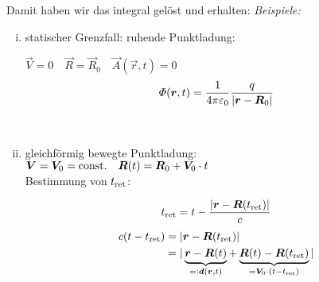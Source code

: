 Damit haben wir das integral gelöst und erhalten:
\noindent
\emph{Beispiele:}
\begin{enumerate}[i)]
	\item statischer Grenzfall: ruhende Punktladung:\\
	\begin{minipage}{.8\linewidth}
		$ \vec{V} = 0 \quad \vec{R} = \vec{R}_0 \quad \vec{A}(\vec{r},t) = 0 $
		\begin{equation*}
		\varPhi(\bm{r},t) = \frac{1}{4\pi\varepsilon_0} \frac{q}{|\bm{r} - \bm{R}_0|}
		\end{equation*}
	\end{minipage}%
	\begin{minipage}{.2\linewidth}
		\flushright
	\end{minipage}%
	\\
	\item gleichförmig bewegte Punktladung:\\
	$ \bm{V} = \bm{V}_0 = \textrm{const.} \quad \bm{R}(t) = \bm{R}_0 + \bm{V}_0 \cdot t $\\[5pt]
	Bestimmung von $ t_{\textrm{ret}} $:\\
	\begin{minipage}{.6\linewidth}
		\begin{equation*}
		t_{\textrm{ret}} = t - \frac{|\bm{r} - \bm{R}(t_{\textrm{ret}})|}{c}
		\end{equation*}
		\begin{align*}
		c(t - t_{\tx{ret}}) &= |\vec{r} - \vec{R}(t_{\tx{ret}})|\\
		&= |\ub{\vec{r} - \vec{R}(t)}_{\eqdef \vec{d}(\vec{r},t)} + \ub{\vec{R}(t) - \vec{R}(t_{\tx{ret}})}_{= \vec{V}_0 \cdot (t - t_{\tx{ret}})}|

\end{align*}
\end{minipage}
\end{enumerate}

